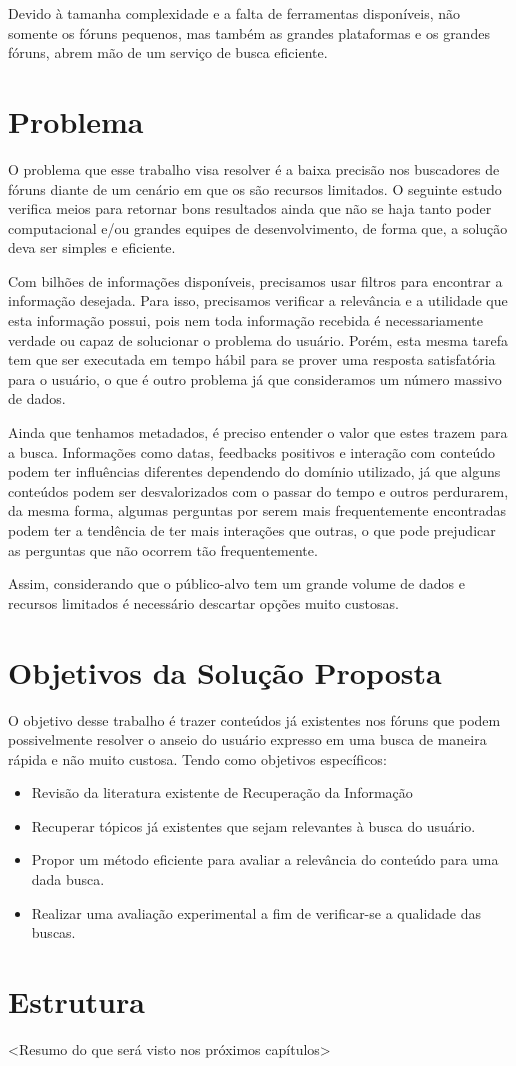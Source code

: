 Devido à tamanha complexidade e a falta de ferramentas disponíveis, não somente os fóruns pequenos, mas também as grandes plataformas e os grandes fóruns, abrem mão de um serviço de busca eficiente. 
\section{Problema}
O problema que esse trabalho visa resolver é a baixa precisão nos buscadores de fóruns diante de um cenário em que os são recursos limitados. O seguinte estudo verifica meios para retornar bons resultados ainda que não se haja tanto poder computacional e/ou grandes equipes de desenvolvimento, de forma que, a solução deva ser simples e eficiente.

Com bilhões de informações disponíveis, precisamos usar filtros para encontrar a informação desejada. Para isso, precisamos verificar a relevância e a utilidade que esta informação possui, pois nem toda informação recebida é necessariamente verdade ou capaz de solucionar o problema do usuário. Porém, esta mesma tarefa tem que ser executada em tempo hábil para se prover uma resposta satisfatória para o usuário, o que é outro problema já que consideramos um número massivo de dados. 

Ainda que tenhamos metadados, é preciso entender o valor que estes trazem para a busca. Informações como datas, feedbacks positivos e interação com conteúdo podem ter influências diferentes dependendo do domínio utilizado, já que alguns conteúdos podem ser desvalorizados com o passar do tempo e outros perdurarem, da mesma forma, algumas perguntas por serem mais frequentemente encontradas podem ter a tendência de ter mais interações que outras, o que pode prejudicar as perguntas que não ocorrem tão frequentemente.

Assim, considerando que o público-alvo tem um grande volume de dados e recursos limitados é necessário descartar opções muito custosas.

\section{Objetivos da Solução Proposta}
O objetivo desse trabalho é trazer conteúdos já existentes nos fóruns que podem possivelmente resolver o anseio do usuário expresso em uma busca de maneira rápida e não muito custosa. Tendo como objetivos específicos:

\begin{itemize}
    \item Revisão da literatura existente de Recuperação da Informação
    \item Recuperar tópicos já existentes que sejam relevantes à busca do usuário.
    \item Propor um método eficiente para avaliar a relevância do conteúdo para uma dada busca.
    \item Realizar uma avaliação experimental a fim de verificar-se a qualidade das buscas.
\end{itemize}

\section{Estrutura}

<Resumo do que será visto nos próximos capítulos>